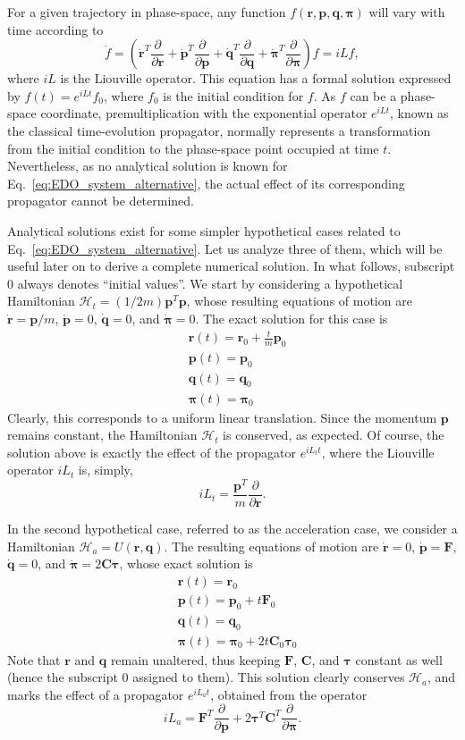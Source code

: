 \documentclass[aip,jcp,reprint,amsmath,amssymb]{revtex4-1}
\newcommand{\mt}[1]{\boldsymbol{\mathbf{#1}}}           %
\newcommand{\vt}[1]{\boldsymbol{\mathbf{#1}}}           %
\newcommand{\tr}[1]{#1^T}                               %
\newcommand{\diff}[2]{\dfrac{\partial #1}{\partial #2}} %
\begin{document}
For a given trajectory in phase-space, any function $f(\vt r, \vt p, \vt q, \vt \pi)$ will vary with time according to
\[
\dot{f} = \left( \tr{\dot{\vt r}} \diff{}{\vt r} + \tr{\dot{\vt p}} \diff{}{\vt p} + \tr{\dot{\vt q}} \diff{}{\vt q} + \tr{\dot{\vt \pi}} \diff{}{\vt \pi} \right) f = i L f,
\]
where $i L$ is the Liouville operator. This equation has a formal solution expressed by $f(t) = e^{i L t}f_0$, where $f_0$ is the initial condition for $f$. As $f$ can be a phase-space coordinate, premultiplication with the exponential operator $e^{i L t}$, known as the classical time-evolution propagator,\cite{Tuckerman2008} normally represents a transformation from the initial condition to the phase-space point occupied at time $t$. Nevertheless, as no analytical solution is known for Eq.~\ref{eq:EDO_system_alternative}, the actual effect of its corresponding propagator cannot be determined.

Analytical solutions exist for some simpler hypothetical cases related to Eq.~\ref{eq:EDO_system_alternative}. Let us analyze three of them, which will be useful later on to derive a complete numerical solution. In what follows, subscript $0$ always denotes ``initial values''. We start by considering a hypothetical Hamiltonian $\mathcal{H}_t = (1/2m) \tr{\vt p} \vt p$, whose resulting equations of motion are $\dot{\vt r} = {\vt p}/m$, $\dot{\vt p} = 0$, $\dot{\vt q} = 0$, and $\dot{\vt \pi} = 0$. The exact solution for this case is
\begin{align*}
&{\vt r}(t) = {\vt r}_0 + \frac{t}{m} {\vt p}_0 \\
&{\vt p}(t) = {\vt p}_0 \\
&{\vt q}(t) = {\vt q}_0 \\
&{\vt \pi}(t) = {\vt \pi}_0
\end{align*}
Clearly, this corresponds to a uniform linear translation. Since the momentum $\vt p$ remains constant, the Hamiltonian $\mathcal{H}_t$ is conserved, as expected. Of course, the solution above is exactly the effect of the propagator $e^{i L_t t}$, where the Liouville operator $i L_t$ is, simply,
\[
i L_t = \frac{\tr{\vt p}}{m}\diff{}{\vt r}.
\]

In the second hypothetical case, referred to as the acceleration case, we consider a Hamiltonian $\mathcal{H}_a = U(\vt r, \vt q)$. The resulting equations of motion are $\dot{\vt r} = 0$, $\dot{\vt p} = \vt F$, $\dot{\vt q} = 0$, and $\dot{\vt \pi} = 2 \mt C \vt \tau$, whose exact solution is
\begin{align*}
&{\vt r}(t) = {\vt r}_0 \\
&{\vt p}(t) = {\vt p}_0 + t \vt F_0 \\
&{\vt q}(t) = {\vt q}_0 \\
&{\vt \pi}(t) = {\vt \pi}_0 +  2 t \mt C_0 \vt \tau_0
\end{align*}
Note that $\vt r$ and $\vt q$ remain unaltered, thus keeping $\vt F$, $\mt C$, and $\vt \tau$ constant as well (hence the subscript $0$ assigned to them). This solution clearly conserves $\mathcal{H}_a$, and marks the effect of a propagator $e^{i L_a t}$, obtained from the operator
\[
i L_a = \tr{\vt F} \diff{}{\vt p} + 2 \tr{\vt \tau} \tr{\mt C} \diff{}{\vt \pi}.
\]
\end{document}
